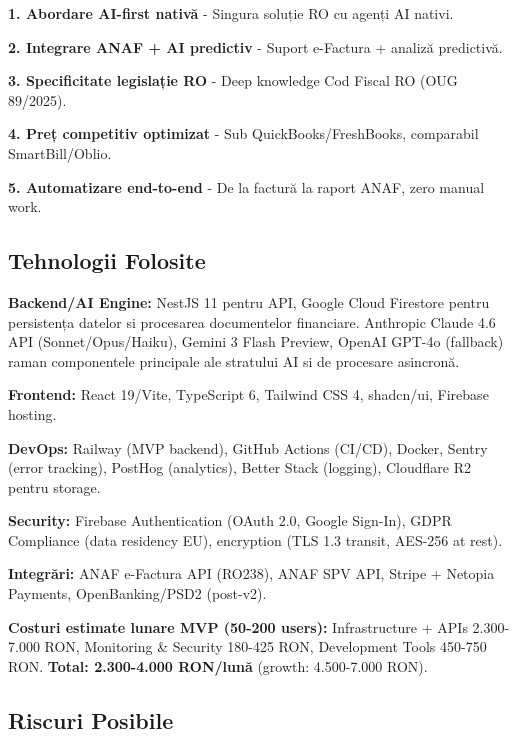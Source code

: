 \documentclass[11pt,a4paper]{article}
\begin{document}
\textbf{1. Abordare AI-first nativă} - Singura soluție RO cu agenți AI nativi.

\textbf{2. Integrare ANAF + AI predictiv} - Suport e-Factura + analiză predictivă.

\textbf{3. Specificitate legislație RO} - Deep knowledge Cod Fiscal RO (OUG 89/2025).

\textbf{4. Preț competitiv optimizat} - Sub QuickBooks/FreshBooks, comparabil SmartBill/Oblio.

\textbf{5. Automatizare end-to-end} - De la factură la raport ANAF, zero manual work.

\subsection{Tehnologii Folosite}

\textbf{Backend/AI Engine:} NestJS 11 pentru API, Google Cloud Firestore pentru persistența datelor si procesarea documentelor financiare. Anthropic Claude 4.6 API (Sonnet/Opus/Haiku), Gemini 3 Flash Preview, OpenAI GPT-4o (fallback) raman componentele principale ale stratului AI si de procesare asincronă.

\textbf{Frontend:} React 19/Vite, TypeScript 6, Tailwind CSS 4, shadcn/ui, Firebase hosting.

\textbf{DevOps:} Railway (MVP backend), GitHub Actions (CI/CD), Docker, Sentry (error tracking), PostHog (analytics), Better Stack (logging), Cloudflare R2 pentru storage.

\textbf{Security:} Firebase Authentication (OAuth 2.0, Google Sign-In), GDPR Compliance (data residency EU), encryption (TLS 1.3 transit, AES-256 at rest).

\textbf{Integrări:} ANAF e-Factura API (RO238), ANAF SPV API, Stripe + Netopia Payments, OpenBanking/PSD2 (post-v2).

\textbf{Costuri estimate lunare MVP (50-200 users):} Infrastructure + APIs 2.300-7.000 RON, Monitoring \& Security 180-425 RON, Development Tools 450-750 RON. \textbf{Total: 2.300-4.000 RON/lună} (growth: 4.500-7.000 RON).

\subsection{Riscuri Posibile}
\end{document}
